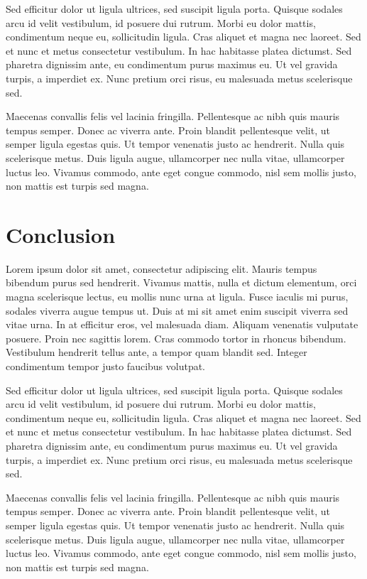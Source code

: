 \documentclass[a4paper, 12pt, titlepage]{article}
\begin{document}
Sed efficitur dolor ut ligula ultrices, sed suscipit ligula porta. Quisque sodales arcu id velit vestibulum, id posuere dui rutrum. Morbi eu dolor mattis, condimentum neque eu, sollicitudin ligula. Cras aliquet et magna nec laoreet. Sed et nunc et metus consectetur vestibulum. In hac habitasse platea dictumst. Sed pharetra dignissim ante, eu condimentum purus maximus eu. Ut vel gravida turpis, a imperdiet ex. Nunc pretium orci risus, eu malesuada metus scelerisque sed.

Maecenas convallis felis vel lacinia fringilla. Pellentesque ac nibh quis mauris tempus semper. Donec ac viverra ante. Proin blandit pellentesque velit, ut semper ligula egestas quis. Ut tempor venenatis justo ac hendrerit. Nulla quis scelerisque metus. Duis ligula augue, ullamcorper nec nulla vitae, ullamcorper luctus leo. Vivamus commodo, ante eget congue commodo, nisl sem mollis justo, non mattis est turpis sed magna.

\section{Conclusion}

Lorem ipsum dolor sit amet, consectetur adipiscing elit. Mauris tempus bibendum purus sed hendrerit. Vivamus mattis, nulla et dictum elementum, orci magna scelerisque lectus, eu mollis nunc urna at ligula. Fusce iaculis mi purus, sodales viverra augue tempus ut. Duis at mi sit amet enim suscipit viverra sed vitae urna. In at efficitur eros, vel malesuada diam. Aliquam venenatis vulputate posuere. Proin nec sagittis lorem. Cras commodo tortor in rhoncus bibendum. Vestibulum hendrerit tellus ante, a tempor quam blandit sed. Integer condimentum tempor justo faucibus volutpat.

Sed efficitur dolor ut ligula ultrices, sed suscipit ligula porta. Quisque sodales arcu id velit vestibulum, id posuere dui rutrum. Morbi eu dolor mattis, condimentum neque eu, sollicitudin ligula. Cras aliquet et magna nec laoreet. Sed et nunc et metus consectetur vestibulum. In hac habitasse platea dictumst. Sed pharetra dignissim ante, eu condimentum purus maximus eu. Ut vel gravida turpis, a imperdiet ex. Nunc pretium orci risus, eu malesuada metus scelerisque sed.

Maecenas convallis felis vel lacinia fringilla. Pellentesque ac nibh quis mauris tempus semper. Donec ac viverra ante. Proin blandit pellentesque velit, ut semper ligula egestas quis. Ut tempor venenatis justo ac hendrerit. Nulla quis scelerisque metus. Duis ligula augue, ullamcorper nec nulla vitae, ullamcorper luctus leo. Vivamus commodo, ante eget congue commodo, nisl sem mollis justo, non mattis est turpis sed magna.
\end{document}
